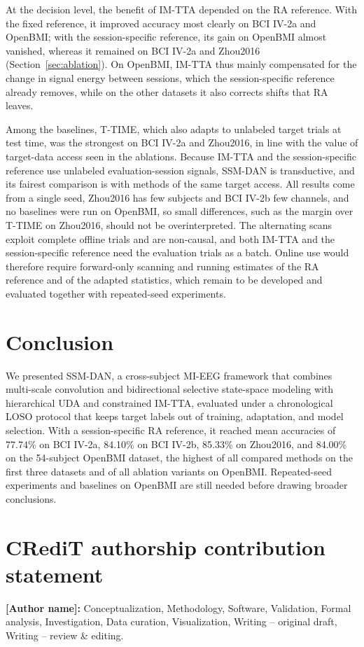 \documentclass[preprint,12pt]{elsarticle}
\begin{document}
At the decision level, the benefit of IM-TTA depended on the RA reference. With the fixed reference, it improved accuracy most clearly on BCI IV-2a and OpenBMI; with the session-specific reference, its gain on OpenBMI almost vanished, whereas it remained on BCI IV-2a and Zhou2016 (Section~\ref{sec:ablation}). On OpenBMI, IM-TTA thus mainly compensated for the change in signal energy between sessions, which the session-specific reference already removes, while on the other datasets it also corrects shifts that RA leaves.

Among the baselines, T-TIME, which also adapts to unlabeled target trials at test time, was the strongest on BCI IV-2a and Zhou2016, in line with the value of target-data access seen in the ablations. Because IM-TTA and the session-specific reference use unlabeled evaluation-session signals, SSM-DAN is transductive, and its fairest comparison is with methods of the same target access. All results come from a single seed, Zhou2016 has few subjects and BCI IV-2b few channels, and no baselines were run on OpenBMI, so small differences, such as the margin over T-TIME on Zhou2016, should not be overinterpreted. The alternating scans exploit complete offline trials and are non-causal, and both IM-TTA and the session-specific reference need the evaluation trials as a batch. Online use would therefore require forward-only scanning and running estimates of the RA reference and of the adapted statistics, which remain to be developed and evaluated together with repeated-seed experiments.

\section{Conclusion}
\label{sec:conclusion}

We presented SSM-DAN, a cross-subject MI-EEG framework that combines multi-scale convolution and bidirectional selective state-space modeling with hierarchical UDA and constrained IM-TTA, evaluated under a chronological LOSO protocol that keeps target labels out of training, adaptation, and model selection. With a session-specific RA reference, it reached mean accuracies of 77.74\% on BCI IV-2a, 84.10\% on BCI IV-2b, 85.33\% on Zhou2016, and 84.00\% on the 54-subject OpenBMI dataset, the highest of all compared methods on the first three datasets and of all ablation variants on OpenBMI. Repeated-seed experiments and baselines on OpenBMI are still needed before drawing broader conclusions.

\section*{CRediT authorship contribution statement}
\textbf{[Author name]:} Conceptualization, Methodology, Software, Validation, Formal analysis, Investigation, Data curation, Visualization, Writing -- original draft, Writing -- review \& editing.
\end{document}
